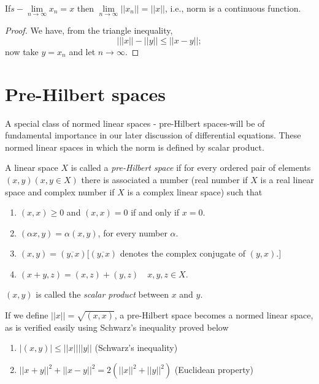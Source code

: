 \begin{prop*}%
 If\pageoriginale $s-\lim\limits_{n \to \infty} x_n = x$ then $\lim\limits_{n \to
  \infty} || x_n || = || x ||$, i.e., norm is a continuous
 function. 
\end{prop*}

\begin{proof}
 We have, from the triangle inequality,
 $$
 \big| || x || - || y || \le || x-y || ;
 $$
 now take $y = x_n$ and let $n \to \infty$.
\end{proof}

\section{Pre-Hilbert spaces}\label{chap1:sec3}

A special class of normed linear spaces - pre-Hilbert spaces-will be
of fundamental importance in our later discussion of differential
equations. These normed linear spaces in which the norm is defined by
scalar product. 

\begin{defi*}%
 A linear space $X$ is called a {\em pre-Hilbert space} if for every
 ordered pair of elements $(x, y) (x, y \in X)$ there is associated a
 number (real number if $X$ is a real linear space and complex number
 if $X$ is a complex linear space) such that 
 \begin{enumerate}[\rm i)]
 \item $(x, x) \ge 0$ and $(x,x) = 0$ if and only if $x = 0$.
 \item $(\alpha x, y) = \alpha(x, y)$, for every number $\alpha$.
 \item $(x, y) = (\overline{y, x}) [(\overline{y, x})$ denotes the
  complex conjugate of $(y, x).]$ 
 \item $(x + y, z) = (x, z) + (y, z) \quad x, y, z \in X$.
 \end{enumerate}
 
 $(x, y)$ is called the \textit{scalar product} between $x$ and $y$.
 
 If we define $|| x || = \sqrt{(x, x)}$, a pre-Hilbert space becomes
 a normed linear space, as is verified easily using Schwarz's
 inequality proved below 
\end{defi*}

\begin{prop*}%
 \begin{enumerate}[\rm i)]
 \item $ | (x, y) | \le || x || || y ||$ \hfill(Schwarz's inequality)
 \item $|| x+ y ||^2 + || x-y ||^2 = 2(||x||^2 + ||y ||^2)$ \hfill 
    {(Euclidean property)}
 \end{enumerate}
\end{prop*}

